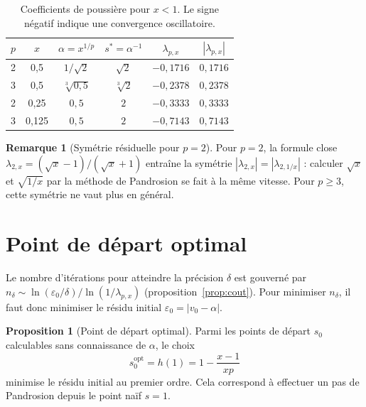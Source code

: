 \documentclass[11pt,a4paper]{article}
\theoremstyle{definition}
\newtheorem{proposition}{Proposition}[section]
\newtheorem{remark}{Remarque}[section]
\newcommand{\cbrt}[1]{\sqrt[3]{#1}}
\newcommand{\eps}{\varepsilon}
\begin{document}
\begin{table}[h]
\centering
\begin{tabular}{cccccc}
\toprule
$p$ & $x$ & $\alpha = x^{1/p}$ & $s^* = \alpha^{-1}$ & $\lambda_{p,x}$ & $|\lambda_{p,x}|$ \\
\midrule
2 & 0{,}5 & $1/\sqrt{2}$ & $\sqrt{2}$ & $-0{,}1716$ & $0{,}1716$ \\
3 & 0{,}5 & $\cbrt{0{,}5}$ & $\cbrt{2}$ & $-0{,}2378$ & $0{,}2378$ \\
2 & 0{,}25 & $0{,}5$ & $2$ & $-0{,}3333$ & $0{,}3333$ \\
3 & 0{,}125 & $0{,}5$ & $2$ & $-0{,}7143$ & $0{,}7143$ \\
\bottomrule
\end{tabular}
\caption{Coefficients de poussière pour $x < 1$. Le signe négatif indique une convergence oscillatoire.}
\end{table}

\begin{remark}[Symétrie résiduelle pour $p=2$]
Pour $p = 2$, la formule close $\lambda_{2,x} = (\sqrt{x}-1)/(\sqrt{x}+1)$ entraîne la symétrie $|\lambda_{2,x}| = |\lambda_{2,1/x}|$ : calculer $\sqrt{x}$ et $\sqrt{1/x}$ par la méthode de Pandrosion se fait à la même vitesse. Pour $p \geq 3$, cette symétrie ne vaut plus en général.
\end{remark}

\section{Point de départ optimal}
\label{sec:optimal_start}

Le nombre d'itérations pour atteindre la précision $\delta$ est gouverné par $n_\delta \sim \ln(\eps_0/\delta) / \ln(1/\lambda_{p,x})$ (proposition~\ref{prop:cout}). Pour minimiser $n_\delta$, il faut donc minimiser le résidu initial $\eps_0 = |v_0 - \alpha|$.

\begin{proposition}[Point de départ optimal]
\label{prop:optimal_start}
Parmi les points de départ $s_0$ calculables sans connaissance de $\alpha$, le choix
\begin{equation}
  \label{eq:optimal_s0}
  s_0^{\mathrm{opt}} = h(1) = 1 - \frac{x-1}{xp}
\end{equation}
minimise le résidu initial au premier ordre. Cela correspond à effectuer un pas de Pandrosion depuis le point naïf $s = 1$.
\end{proposition}
\end{document}

